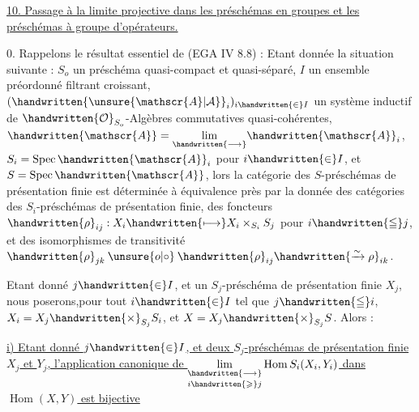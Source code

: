 
\uline{10. Passage à la limite projective dans les préschémas en groupes et les préschémas à groupe d'opérateurs.}

0. Rappelons le résultat essentiel de (EGA IV 8.8) : Etant donnée la situation suivante : $S_o$ un préschéma qu\handwritten{/}asi-compact et quasi-séparé, $I$ un ensemble préordonné filtrant croissant, $(\handwritten{\unsure{\mathscr{A}|\mathcal{A}}}_i)_{i\handwritten{\in}I}$ un système inductif de $\handwritten{\mathcal{O}}_{S_o}$-Algèbres commutatives quasi-cohérentes, $\handwritten{\mathscr{A}}=\underset{\handwritten{\longrightarrow}}{\lim}\handwritten{\mathscr{A}}_i$, $S_i=\operatorname{Spec}\handwritten{\mathscr{A}}_i$ pour $i\handwritten{\in}I$, et $S=\operatorname{Spec}\handwritten{\mathscr{A}}$, lors la catégorie des $S$-préschémas de présentation finie est déterminée à équivalence près par la donnée des catégories des $S_i$-préschémas de présentation finie, des foncteurs  $\handwritten{\rho}_{ij}:X_i\handwritten{\longmapsto}X_i\times_{S_i}S_j$ \deleted{\unsure{,}} pour $i\handwritten{\leqq}j$, et des isomorphismes de transitivité $\handwritten{\rho}_{jk}\mathbin{\unsure{o|\circ}}\handwritten{\rho}_{ij}\handwritten{\xrightarrow{\sim}\rho}_{ik}$.  

Etant donné $j\handwritten{\in}I$, et un $S_j$-préschéma de présentation finie $X_j$, nous poserons,pour tout $i\handwritten{\in}I$ tel que $j\handwritten{\leqq}i$, $X_i=X_j\handwritten{\times}_{S_j}S_i$, et $X=X_j\handwritten{\times}_{S_j}S$. Alors :\handwritten{\unsure{;|:}}\margin{\handwritten{(}}

\uline{i) Etant donné $j\handwritten{\in}I$, et deux $S_j$-préschémas de présentation finie $X_j$ et $Y_j$, l'application canonique de $\underset{i\handwritten{\geqslant}j}{\underset{\handwritten{\longrightarrow}}{\lim}}\operatorname{Hom} S_i(X_i,Y_i)$ dans $\operatorname{Hom}(X,Y)$ est bijective}\margin{\handwritten{(}}

